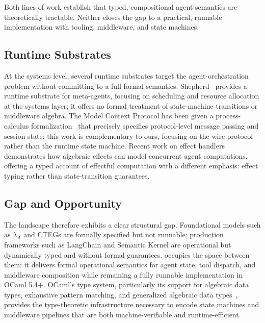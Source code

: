 Both lines of work establish that typed, compositional agent semantics are theoretically tractable.
Neither closes the gap to a practical, runnable implementation with tooling, middleware, and state machines.

\subsection{Runtime Substrates}
\label{sec:substrates}

At the systems level, several runtime substrates target the agent-orchestration problem without committing to a full formal semantics.
Shepherd~\cite{shepherd} provides a runtime substrate for meta-agents, focusing on scheduling and resource allocation at the systems layer; it offers no formal treatment of state-machine transitions or middleware algebra.
The Model Context Protocol has been given a process-calculus formalization~\cite{mcp-formal} that precisely specifies protocol-level message passing and session state; this work is complementary to ours, focusing on the wire protocol rather than the runtime state machine.
Recent work on effect handlers~\cite{effect-handlers-survey} demonstrates how algebraic effects can model concurrent agent computations, offering a typed account of effectful computation with a different emphasis: effect typing rather than state-transition guarantees.

\subsection{Gap and Opportunity}
\label{sec:gap}

The landscape therefore exhibits a clear structural gap.
Foundational models such as $\lambda_A$ and CTEGs are formally specified but not runnable; production frameworks such as LangChain and Semantic Kernel are operational but dynamically typed and without formal guarantees.
\PAR occupies the space between them: it delivers formal operational semantics for agent state, tool dispatch, and middleware composition while remaining a fully runnable implementation in OCaml 5.4+.
OCaml's type system, particularly its support for algebraic data types, exhaustive pattern matching, and generalized algebraic data types~\cite{ocaml-manual}, provides the type-theoretic infrastructure necessary to encode state machines and middleware pipelines that are both machine-verifiable and runtime-efficient.
